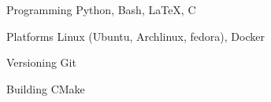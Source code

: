 


\begin{cvskills}


\cvskill
{Programming} %
{Python, Bash, LaTeX, C} %


\cvskill
{Platforms} %
{Linux (Ubuntu, Archlinux, fedora), Docker} %


\cvskill
{Versioning} %
{Git} %


\cvskill
{Building} %
{CMake} %


\end{cvskills}
